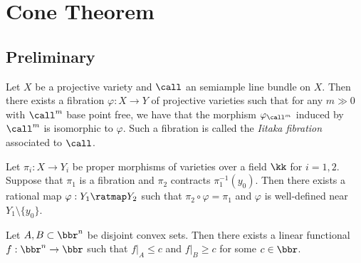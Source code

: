 \section{Cone Theorem}


\subsection{Preliminary}

    \begin{theorem}\label{thm: Iitaka fibration in semiample case}
        Let \(X\) be a projective variety and \(\call\) an semiample line bundle on \(X\).
        Then there exists a fibration \(\varphi: X \to Y\) of projective varieties 
        such that for any \(m\gg 0\) with \(\call^m\) base point free, we have that the morphism \(\varphi_{\call^m}\) induced by \(\call^m\) is isomorphic to \(\varphi\).
        Such a fibration is called the \emph{Iitaka fibration} associated to \(\call\).
    \end{theorem}

    \begin{theorem}\label{thm: Rigidity Lemma}
        Let \(\pi_i: X \to Y_i\) be proper morphisms of varieties over a field \(\kk\) for \(i=1,2\).
        Suppose that \(\pi_1\) is a fibration and \(\pi_2\) contracts \(\pi_1^{-1}(y_0)\).
        Then there exists a rational map \(\varphi: Y_1 \ratmap Y_2\) such that \(\pi_2 \circ \varphi = \pi_1\) and \(\varphi\) is well-defined near \(Y_1 \setminus \{y_0\}\). 
    \end{theorem}

    \begin{theorem}\label{thm:convex_separation_theorem}
        Let \(A,B \subset \bbr^n\) be disjoint convex sets.
        Then there exists a linear functional \(f: \bbr^n \to \bbr\) such that \(f|_A \leq c\) and \(f|_B \geq c\) for some \(c \in \bbr\).
    \end{theorem}


